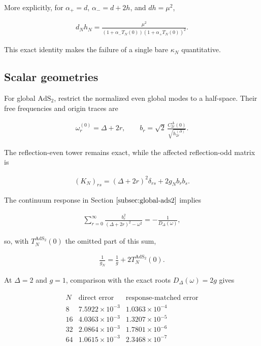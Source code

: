 More explicitly, for $\alpha_+=d$, $\alpha_-=d+2h$, and $dh=\mu^2$,

\begin{align}
d_Nh_N
=\frac{\mu^2}{
\left(1+\alpha_-T_N(0)\right)
\left(1+\alpha_+T_N(0)\right)^2}.
\end{align}

This exact identity makes the failure of a single bare $\kappa_N$ quantitative.

\subsection{Scalar geometries}\label{subsec:numerics-scalar-geometries}

For global $\mathrm{AdS}_2$, restrict the normalized even global modes to a half-space. Their free frequencies and origin traces are

\begin{align}
\omega_r^{(0)}=\Delta+2r,
\qquad
b_r=\sqrt2\,
\frac{C_{2r}^{\Delta}(0)}{\sqrt{h_{2r}^{(\Delta)}}}.
\end{align}

The reflection-even tower remains exact, while the affected reflection-odd matrix is

\begin{align}
(K_N)_{rs}
=(\Delta+2r)^2\delta_{rs}+2g_Nb_rb_s.
\end{align}

The continuum response in Section $\ref{subsec:global-ads2}$ implies

\begin{align}
\sum_{r=0}^{\infty}
\frac{b_r^2}{(\Delta+2r)^2-\omega^2}
=-\frac1{D_\Delta(\omega)},
\end{align}

so, with $T_N^{\mathrm{AdS}_2}(0)$ the omitted part of this sum,

\begin{align}
\frac1{g_N}=\frac1g+2T_N^{\mathrm{AdS}_2}(0).
\end{align}

At $\Delta=2$ and $g=1$, comparison with the exact roots $D_\Delta(\omega)=2g$ gives

\begin{align}
\begin{array}{c|cc}
N & \text{direct error} & \text{response-matched error} \\ \hline
8  & 7.5922\times10^{-3} & 1.0363\times10^{-4} \\
16 & 4.0363\times10^{-3} & 1.3207\times10^{-5} \\
32 & 2.0864\times10^{-3} & 1.7801\times10^{-6} \\
64 & 1.0615\times10^{-3} & 2.3468\times10^{-7}
\end{array}
\end{align}

